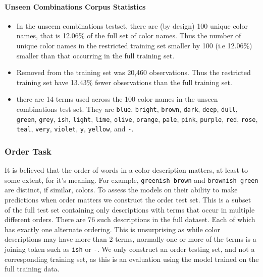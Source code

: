 \documentclass[]{clv3}
\newcommand{\natlang}[1]{\texttt{#1}}
\begin{document}
\paragraph{Unseen Combinations Corpus Statistics}
\begin{itemize}
	\item In the unseem combinations testset, there are (by design) 100 unique color names, that is 12.06\% of the full set of color names. Thus the number of unique color names in the restricted training set smaller by 100 (i.e 12.06\%) smaller than that occurring in the full training set.
	\item Removed from the training set was 20,460 observations. Thus the restricted training set have 13.43\% fewer observations than the full training set.
	\item there are 14 terms used across the 100 color names in the unseen combinations test set.
	They are \natlang{blue}, \natlang{bright}, \natlang{brown}, \natlang{dark}, \natlang{deep}, \natlang{dull}, \natlang{green}, \natlang{grey}, \natlang{ish}, \natlang{light}, \natlang{lime}, \natlang{olive}, \natlang{orange}, \natlang{pale}, \natlang{pink}, \natlang{purple}, \natlang{red}, \natlang{rose}, \natlang{teal}, \natlang{very}, \natlang{violet}, \natlang{y}, \natlang{yellow}, and \natlang{-}.
\end{itemize}


\subsubsection{Order Task}\label{sec:orderdata}
It is believed that the order of words in a color description matters, at least to some extent, for it's meaning.
For example, \natlang{greenish brown} and \natlang{brownish green} are distinct, if similar, colors.
To assess the models on their ability to make predictions when order matters we construct the order test set.
This is a subset of the full test set containing only descriptions with terms that occur in multiple different orders.
There are 76 such descriptions in the full dataset.
Each of which has exactly one alternate ordering.
This is unsurprising as while color descriptions may have more than 2 terms, normally one or more of the terms is a joining token such as \natlang{ish} or \natlang{-}.
We only construct an order testing set, and not a corresponding training set, as this is an evaluation using the model trained on the full training data.
\end{document}
